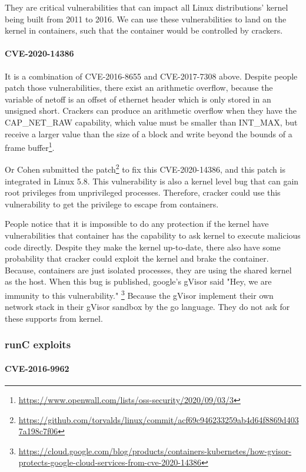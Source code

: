 They are critical vulnerabilities that can impact all Linux distributions' kernel being
built from 2011 to 2016. We can use these vulnerabilities to land on the kernel in
containers, such that the container would be controlled by crackers.

\paragraph{CVE-2020-14386} It is a combination of CVE-2016-8655 and CVE-2017-7308 above.
Despite people patch those vulnerabilities, there exist an arithmetic overflow, because
the variable of netoff is an offset of ethernet header which is only stored in an unsigned
short. Crackers can produce an arithmetic overflow when they have the CAP\_NET\_RAW capability,
which value must be smaller than INT\_MAX, but receive a larger value than the size of a
block and write beyond the bounds of a frame buffer\footnote{\url{https://www.openwall.com/lists/oss-security/2020/09/03/3}}.

Or Cohen submitted the patch\footnote{\url{https://github.com/torvalds/linux/commit/acf69c946233259ab4d64f8869d4037a198c7f06}}
to fix this CVE-2020-14386, and this patch is integrated in Linux 5.8. This vulnerability
is also a kernel level bug that can gain root privileges from unprivileged processes.
Therefore, cracker could use this vulnerability to get the privilege to escape from containers.

People notice that it is impossible to do any protection if the kernel have vulnerabilities
that container has the capability to ask kernel to execute malicious code directly. Despite
they make the kernel up-to-date, there also have some probability that cracker could exploit
the kernel and brake the container. Because, containers are just isolated processes, they
are using the shared kernel as the host. When this bug is published, google's gVisor said
"Hey, we are immunity to this vulnerability." \footnote{\url{https://cloud.google.com/blog/products/containers-kubernetes/how-gvisor-protects-google-cloud-services-from-cve-2020-14386}}
Because the gVisor implement their own network stack in their gVisor sandbox by the go language.
They do not ask for these supports from kernel.

\subsubsection{runC exploits}
\paragraph{CVE-2016-9962}

